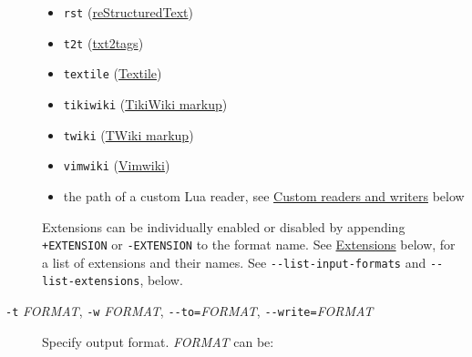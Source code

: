 \begin{description}
\begin{itemize}
\item
  \texttt{rst}
  (\href{https://docutils.sourceforge.io/docs/ref/rst/introduction.html}{reStructuredText})
\item
  \texttt{t2t} (\href{https://txt2tags.org}{txt2tags})
\item
  \texttt{textile} (\href{https://www.promptworks.com/textile}{Textile})
\item
  \texttt{tikiwiki}
  (\href{https://doc.tiki.org/Wiki-Syntax-Text\#The_Markup_Language_Wiki-Syntax}{TikiWiki
  markup})
\item
  \texttt{twiki}
  (\href{https://twiki.org/cgi-bin/view/TWiki/TextFormattingRules}{TWiki
  markup})
\item
  \texttt{vimwiki} (\href{https://vimwiki.github.io}{Vimwiki})
\item
  the path of a custom Lua reader, see
  \protect\hyperlink{custom-readers-and-writers}{Custom readers and
  writers} below
\end{itemize}

Extensions can be individually enabled or disabled by appending
\texttt{+EXTENSION} or \texttt{-EXTENSION} to the format name. See
\protect\hyperlink{extensions}{Extensions} below, for a list of
extensions and their names. See \texttt{-\/-list-input-formats} and
\texttt{-\/-list-extensions}, below.
\item[\texttt{-t} \emph{FORMAT}, \texttt{-w} \emph{FORMAT},
\texttt{-\/-to=}\emph{FORMAT}, \texttt{-\/-write=}\emph{FORMAT}]
Specify output format. \emph{FORMAT} can be:


\end{description}
